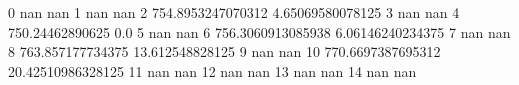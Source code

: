 0 nan nan
1 nan nan
2 754.8953247070312 4.65069580078125
3 nan nan
4 750.24462890625 0.0
5 nan nan
6 756.3060913085938 6.06146240234375
7 nan nan
8 763.857177734375 13.612548828125
9 nan nan
10 770.6697387695312 20.42510986328125
11 nan nan
12 nan nan
13 nan nan
14 nan nan
